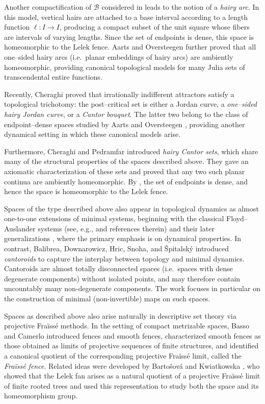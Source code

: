 \documentclass[11pt]{amsart}
\begin{document}
Another compactification of $\mathcal{B}$ considered in \cite{AO93} leads to the notion of a \emph{hairy arc}. In this model, vertical hairs are attached to a base interval according to a length function $\ell:I\to I$, producing a compact subset of the unit square whose fibers are intervals of varying lengths. Since the set of endpoints is dense, this space is homeomorphic to the Lelek fence. Aarts and Oversteegen further proved that all one--sided hairy arcs (i.e.\ planar embeddings of hairy arcs) are ambiently homeomorphic, providing canonical topological models for many Julia sets of transcendental entire functions.

Recently, Cheraghi \cite{Cheraghi2025} proved that irrationally indifferent attractors satisfy a topological trichotomy: the post--critical set is either a Jordan curve, a \emph{one--sided hairy Jordan curve}, or a \emph{Cantor bouquet}. The latter two belong to the class of endpoint--dense spaces studied by Aarts and Oversteegen \cite{AO93}, providing another dynamical setting in which these canonical models arise.  

Furthermore, Cheraghi and Pedramfar \cite{haircantorset} introduced \emph{hairy Cantor sets}, which share many of the structural properties of the spaces described above. They gave an axiomatic characterization of these sets and proved that any two such planar continua are ambiently homeomorphic. By \cite[Corollary~5.6]{haircantorset}, the set of endpoints is dense, and hence the space is homeomorphic to the Lelek fence.

Spaces of the type described above also appear in topological dynamics as almost one-to-one extensions of minimal systems, beginning with the classical Floyd--Auslander systems (see, e.g., \cite{HaddadJohnson97} and references therein) and their later generalizations \cite{DeeleyPutnamStrung}, where the primary emphasis is on dynamical properties. In contrast, Balibrea, Downarowicz, Hric, Snoha, and \v Spitalsk\'y \cite{BalibreaDownarowiczHricSnohaSpitalsky} introduced \emph{cantoroids} to capture the interplay between topology and minimal dynamics. Cantoroids are almost totally disconnected spaces (i.e.\ spaces with dense degenerate components) without isolated points, and may therefore contain uncountably many non-degenerate components. The work \cite{BalibreaDownarowiczHricSnohaSpitalsky} focuses in particular on the construction of minimal (non-invertible) maps on such spaces.

Spaces as described above also arise naturally in descriptive set theory via projective Fra\"iss\'e methods. In the setting of compact metrizable spaces, Basso and Camerlo \cite{BassoCamerlo} introduced fences and smooth fences, characterized smooth fences as those obtained as limits of projective sequences of finite structures, and identified a canonical quotient of the corresponding projective Fra\"iss\'e limit, called the \emph{Fra\"iss\'e fence}. Related ideas were developed by Barto\v{s}ov\'a and Kwiatkowska \cite{BartosovaKwiatkowska2015}, who showed that the Lelek fan arises as a natural quotient of a projective Fra\"iss\'e limit of finite rooted trees and used this representation to study both the space and its homeomorphism group.  
\end{document}
